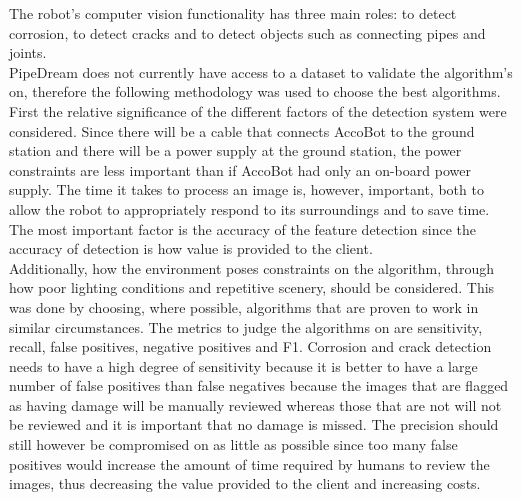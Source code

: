\documentclass[11pt]{article}		%
\begin{document}
			The robot’s computer vision functionality has three main roles: to detect corrosion, to detect cracks and to detect objects such as connecting pipes and joints. 
			\\ \hspace*{3ex}
			PipeDream does not currently have access to a dataset to validate the algorithm’s on, therefore the following methodology was used to choose the best algorithms. First the relative significance of the different factors of the detection system were considered. Since there will be a cable that connects AccoBot to the ground station and there will be a power supply at the ground station, the power constraints are less important than if AccoBot had only an on-board power supply. The time it takes to process an image is, however, important, both to allow the robot to appropriately respond to its surroundings and to save time. The most important factor is the accuracy of the feature detection since the accuracy of detection is how value is provided to the client. 
			\\ \hspace*{3ex}
        Additionally, how the environment poses constraints on the algorithm, through how poor lighting conditions and repetitive scenery, should be considered. This was done by choosing, where possible, algorithms that are proven to work in similar circumstances. The metrics to judge the algorithms on are sensitivity, recall, false positives, negative positives and F1. Corrosion and crack detection needs to have a high degree of sensitivity because it is better to have a large number of false positives than false negatives because the images that are flagged as having damage will be manually reviewed whereas those that are not will not be reviewed and it is important that no damage is missed. The precision should still however be compromised on as little as possible since too many false positives would increase the amount of time required by humans to review the images, thus decreasing the value provided to the client and increasing costs. 
			\\
	        
\end{document}
